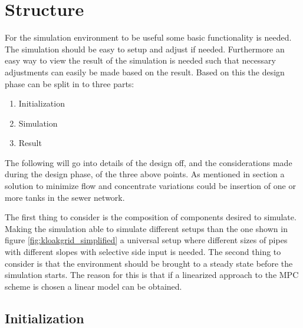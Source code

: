 \section{Structure}\label{sec:Structure}
For the simulation environment to be useful some basic functionality is needed. The simulation should be easy to setup and adjust if needed. 
Furthermore an easy way to view the result of the simulation is needed such that necessary adjustments can easily be made based on the result.
Based on this the design phase can be split in to three parts:

\begin{enumerate}
	\item Initialization
	\item Simulation
	\item Result
\end{enumerate}

The following will go into details of the design off, and the considerations made during the design phase, of the three above points.
As mentioned in section  a solution to minimize flow and concentrate variations could be insertion of one or more tanks in the sewer network. 

The first thing to consider is the composition of components desired to simulate. Making the simulation able to simulate different setups than the one shown in figure \ref{fig:kloakgrid_simplified} a universal setup where different sizes of pipes with different slopes with selective side input is needed. 
The second thing to consider is that the environment should be brought to a steady state before the simulation starts. The reason for this is that if a linearized approach to the MPC scheme is chosen a linear model can be obtained. 

\subsection*{Initialization} 